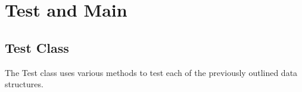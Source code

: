 \documentclass[letterpaper, 10pt,DIV=13]{scrartcl}
\numberwithin{equation}{section} %
\numberwithin{figure}{section} %
\numberwithin{table}{section} %
\begin{document}

\section{Test and Main}
\subsection{Test Class}
The Test class uses various methods to test each of the previously outlined data structures.
\end{document}
